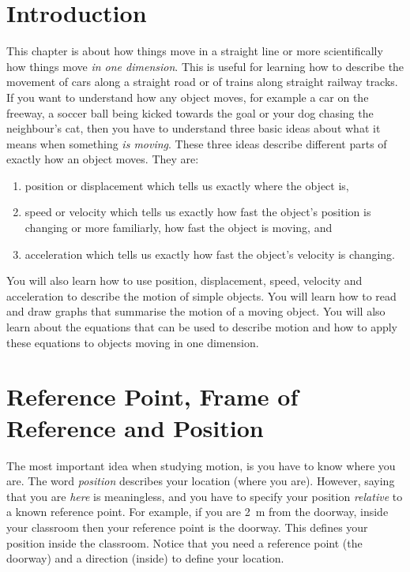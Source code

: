 \section{Introduction}
This chapter is about how things move in a straight line or more scientifically how things move \textit{in one dimension}. This is useful for learning how to describe the movement of cars along a straight road or of trains along straight railway tracks. If you want to understand how any object moves, for example a car on the freeway, a soccer ball being kicked towards the goal or your dog chasing the neighbour's cat, then you have to understand three basic ideas about what it means when something \textit{is moving}. These three ideas describe different parts of exactly how an object moves. They are:
\begin{enumerate}
\item{position or displacement which tells us exactly where the object is,}
\item{speed or velocity which tells us exactly how fast the object's position is changing or more familiarly, how fast the object is moving, and}
\item{acceleration which tells us exactly how fast the object's velocity is changing.}
\end{enumerate}

You will also learn how to use position, displacement, speed, velocity and acceleration to describe the motion of simple objects. You will learn how to read and draw graphs that summarise the motion of a moving object. You will also learn about the equations that can be used to describe motion and how to apply these equations to objects moving in one dimension.

\section{Reference Point, Frame of Reference and Position}

The most important idea when studying motion, is you have to know where you are. The word \textit{position} describes your location (where you are). However, saying that you are \textit{here} is meaningless, and you have to specify your position \textit{relative} to a known reference point. For example, if you are 2~m from the doorway, inside your classroom then your reference point is the doorway. This defines your position inside the classroom. Notice that you need a reference point (the doorway) and a direction (inside) to define your location.

